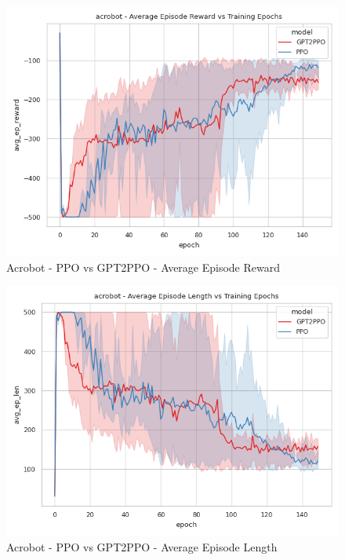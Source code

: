 \begin{figure}[htbp]
    \centerline{\includegraphics[width=\columnwidth]{./img/acrobot-avg_ep_reward-model.png}}
    \caption{Acrobot - PPO vs GPT2PPO - Average Episode Reward}
    \label{acrobot-avg_ep_reward-model}
\end{figure}

\begin{figure}[htbp]
    \centerline{\includegraphics[width=\columnwidth]{./img/acrobot-avg_ep_len-model.png}}
    \caption{Acrobot - PPO vs GPT2PPO - Average Episode Length}
    \label{acrobot-avg_ep_len-model}
\end{figure}

